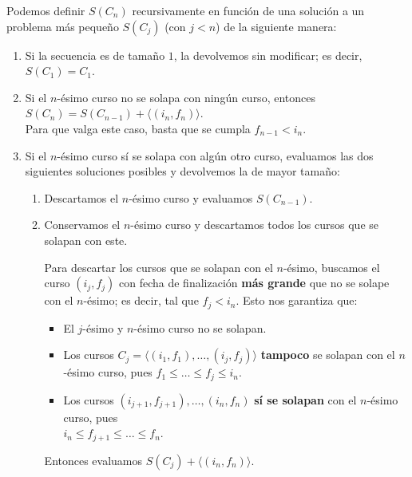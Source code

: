 \documentclass[a4paper,10pt,twoside]{article}
\begin{document}
Podemos definir $S(C_n)$ recursivamente en función de una solución a un problema más pequeño $S(C_j)$ (con $j < n$) de la siguiente manera:

\begin{enumerate}
    \item{
        Si la secuencia es de tamaño $1$, la devolvemos sin modificar; es decir, $S(C_1) = C_1$.
    }

    \item{
        Si el $n$-ésimo curso no se solapa con ningún curso, entonces $S(C_n) = S(C_{n-1}) + \langle (i_n, f_n) \rangle$.\\
        Para que valga este caso, basta que se cumpla $f_{n-1} < i_n$.
    }

    \item\label{n-esimo-solapa}{
        Si el $n$-ésimo curso sí se solapa con algún otro curso, evaluamos las dos siguientes soluciones posibles y devolvemos la de mayor tamaño:

        \begin{enumerate}
            \item{
                Descartamos el $n$-ésimo curso y evaluamos $S(C_{n-1})$.
            }
            \item{
                Conservamos el $n$-ésimo curso y descartamos todos los cursos que se solapan con este.

                Para descartar los cursos que se solapan con el $n$-ésimo, buscamos el curso $(i_j, f_j)$ con fecha de finalización \textbf{más grande} que no se solape con el $n$-ésimo; es decir, tal que $f_j < i_n$. Esto nos garantiza que:

                \begin{itemize}
                    \item{
                        El $j$-ésimo y $n$-ésimo curso no se solapan.
                    }
                    
                    \item{
                        Los cursos $C_j = \langle (i_1, f_1), \ldots, (i_j, f_j) \rangle$ \textbf{tampoco} se solapan con el $n$-ésimo curso, pues $f_1 \leq \ldots \leq f_j \leq i_n$.
                    }

                    \item{
                        Los cursos $(i_{j+1}, f_{j+1}), \ldots, (i_n, f_n)$ \textbf{sí se solapan} con el $n$-ésimo curso, pues\\
                        $i_n \leq f_{j+1} \leq \ldots \leq f_n$.
                    }
                \end{itemize}

                Entonces evaluamos $S(C_j) + \langle (i_n, f_n) \rangle$.
            }
        \end{enumerate}
    }
\end{enumerate}
\end{document}
